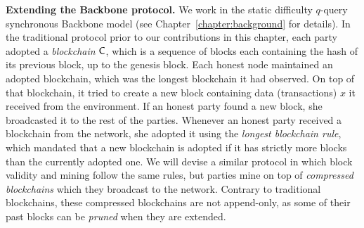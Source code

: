 \textbf{Extending the Backbone protocol.}
We work in the static difficulty $q$-query synchronous Backbone model
(see Chapter~\ref{chapter:background} for details). In the traditional protocol
prior to our contributions in this chapter, each party adopted a
\emph{blockchain} $\mathsf{C}$, which is a sequence of blocks each containing the
hash of its previous block, up to the genesis block. Each honest node maintained
an adopted blockchain, which was the longest blockchain it had observed. On top
of that blockchain, it tried to create a new block containing data
(transactions) $x$ it received from the environment. If an
honest party found a new block, she broadcasted it to the rest of the parties.
Whenever an honest party received a blockchain from the network, she adopted it
using the \emph{longest blockchain rule}, which mandated that a new blockchain
is adopted if it has strictly more blocks than the currently adopted one.
We will devise a similar protocol in which block validity and mining follow the
same rules, but parties mine on top of \emph{compressed blockchains} which they
broadcast to the network. Contrary to traditional blockchains, these compressed
blockchains are not append-only, as some of their past blocks can be
\emph{pruned} when they are extended.

%
%

